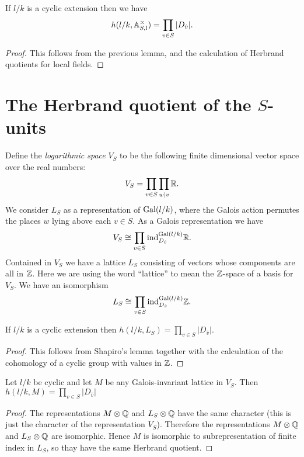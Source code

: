 \begin{lemma}
	If $l/k$ is a cyclic extension then we have
	\[
		h(l/k, {\mathbb A}_{S,l} ^\times )
		=
		\prod_{v \in S} |D_{\hat v}|.
	\]
\end{lemma}

\begin{proof}
	This follows from the previous lemma, and the
	calculation of Herbrand quotients for local fields.
\end{proof}



\section{The Herbrand quotient of the $S$-units}

Define the \emph{logarithmic space} $V_S$ to be the following finite dimensional vector space
over the real numbers:
\[
	V_S = \prod_{v \in S} \prod_{w | v} {\mathbb R}.
\]
We consider $L_S$ as a representation of $\mathrm{Gal}(l/k)$, where the Galois action
permutes the places $w$ lying above each $v \in S$.
As a Galois representation we have
\[
	V_S \cong \prod_{v \in S} \mathrm{ind}_{D_{\hat v}}^{\mathrm{Gal}(l/k)} {\mathbb R}.
\]
Contained in $V_S$ we have a lattice $L_S$ consisting of vectors whose components are all in ${\mathbb Z}$.
Here we are using the word ``lattice'' to mean the ${\mathbb Z}$-space of a basis for $V_S$.
We have an isomorphism
\[
	L_S \cong \prod_{v \in S} \mathrm{ind}_{D_{\hat v}}^{\mathrm{Gal}(l/k)} {\mathbb Z}.
\]

\begin{lemma}
	If $l/k$ is a cyclic extension then
	$h(l/k,L_S) = \prod_{v \in S} |D_{\hat v}|$.
\end{lemma}

\begin{proof}
	This follows from Shapiro's lemma together with
	the calculation of the cohomology of a cyclic group with values in ${\mathbb Z}$.
\end{proof}

\begin{lemma}
	Let $l/k$ be cyclic and let $M$ be any Galois-invariant lattice in $V_S$.
	Then $h(l/k,M) = \prod_{v \in S} |D_{\hat v}|$
\end{lemma}

\begin{proof}
	The representations $M \otimes {\mathbb Q}$ and $L_S \otimes {\mathbb Q}$ have the same character
	(this is just the character of the representation $V_S$).
	Therefore the representations $M \otimes {\mathbb Q}$ and $L_S \otimes {\mathbb Q}$ are isomorphic.
	Hence $M$ is isomorphic to subrepresentation of finite index in $L_S$,
	so thay have the same Herbrand quotient.
\end{proof}


